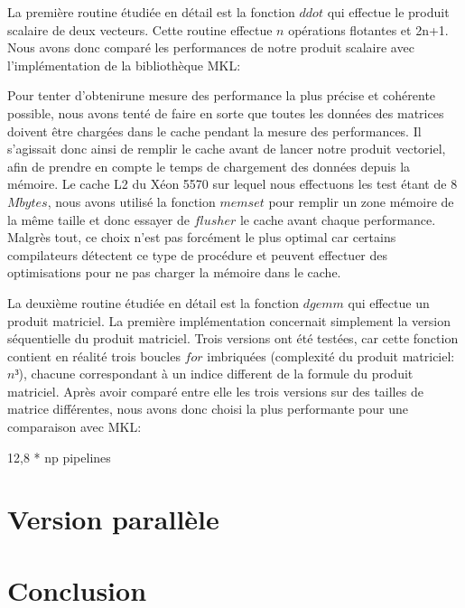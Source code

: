 \documentclass[a4paper,11pt]{article}
\begin{document}
La première routine étudiée en détail est la fonction $ddot$ qui effectue le produit scalaire de deux vecteurs. Cette routine effectue $n$ opérations flotantes et 2n+1. Nous avons donc comparé les performances de notre produit scalaire avec l'implémentation de la bibliothèque MKL:

Pour tenter d'obtenirune mesure des performance la plus précise et cohérente possible, nous avons tenté de faire en sorte que toutes les données des matrices doivent être chargées dans le cache pendant la mesure des performances. Il s'agissait donc ainsi de remplir le cache avant de lancer notre produit vectoriel, afin de prendre en compte le temps de chargement des données depuis la mémoire. Le cache L2 du Xéon 5570 sur lequel nous effectuons les test étant de 8 $Mbytes$, nous avons utilisé la fonction $memset$ pour remplir un zone mémoire de la même taille et donc essayer de $flusher$ le cache avant chaque performance. Malgrès tout, ce choix n'est pas forcément le plus optimal car certains compilateurs détectent ce type de procédure et peuvent effectuer des optimisations pour ne pas charger la mémoire dans le cache.


La deuxième routine étudiée en détail est la fonction $dgemm$ qui effectue un produit matriciel. La première implémentation concernait simplement la version séquentielle du produit matriciel. Trois versions ont été testées, car cette fonction contient en réalité trois boucles $for$ imbriquées (complexité du produit matriciel: $n³$), chacune correspondant à un indice different de la formule du produit matriciel. Après avoir comparé entre elle les trois versions sur des tailles de matrice différentes, nous avons donc choisi la plus performante pour une comparaison avec MKL:



12,8 * np pipelines

\section{Version parallèle}

\section{Conclusion}
\end{document}

